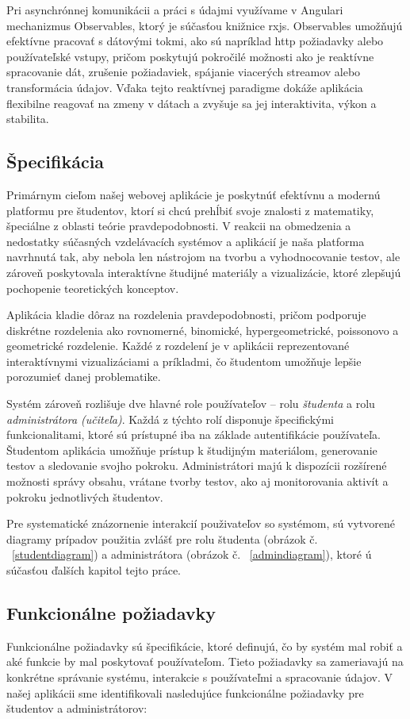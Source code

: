  Pri asynchrónnej komunikácii a práci s údajmi využívame v Angulari mechanizmus Observables, ktorý je súčasťou knižnice \acrshort{rxjs}. 
 Observables umožňujú efektívne pracovať s dátovými tokmi, ako sú napríklad \acrshort{http} požiadavky alebo používateľské vstupy, pričom poskytujú pokročilé možnosti ako je reaktívne spracovanie dát, zrušenie požiadaviek, spájanie viacerých streamov alebo transformácia údajov. 
 Vďaka tejto reaktívnej paradigme dokáže aplikácia flexibilne reagovať na zmeny v dátach a zvyšuje sa jej interaktivita, výkon a stabilita.


\subsection{Špecifikácia}
Primárnym cieľom našej webovej aplikácie je poskytnúť efektívnu a modernú platformu pre študentov, ktorí si chcú prehĺbiť svoje znalosti z matematiky, špeciálne z oblasti teórie pravdepodobnosti.
 V reakcii na obmedzenia a nedostatky súčasných vzdelávacích systémov a aplikácií je naša platforma navrhnutá tak, aby nebola len nástrojom na tvorbu a vyhodnocovanie testov, ale zároveň poskytovala interaktívne študijné materiály a vizualizácie, ktoré zlepšujú pochopenie teoretických konceptov.

Aplikácia kladie dôraz na rozdelenia pravdepodobnosti, pričom podporuje diskrétne rozdelenia ako rovnomerné, binomické, hypergeometrické, poissonovo a geometrické rozdelenie.
 Každé z rozdelení je v aplikácii reprezentované interaktívnymi vizualizáciami a príkladmi, čo študentom umožňuje lepšie porozumieť danej problematike.

Systém zároveň rozlišuje dve hlavné role používateľov – rolu \textit{študenta} a rolu \textit{administrátora (učiteľa)}. Každá z týchto rolí disponuje špecifickými funkcionalitami, ktoré sú prístupné iba na základe autentifikácie používateľa.
 Študentom aplikácia umožňuje prístup k študijným materiálom, generovanie testov a sledovanie svojho pokroku.
  Administrátori majú k dispozícii rozšírené možnosti správy obsahu, vrátane tvorby testov, ako aj monitorovania aktivít a pokroku jednotlivých študentov.

  Pre systematické znázornenie interakcií použivateľov so systémom, sú vytvorené diagramy prípadov použitia zvlášť pre rolu študenta (obrázok č. ~\ref{studentdiagram}) a administrátora (obrázok č. ~\ref{admindiagram}), ktoré ú súčasťou ďalších kapitol tejto práce.

\subsection{Funkcionálne požiadavky}
Funkcionálne požiadavky sú špecifikácie, ktoré definujú, čo by systém mal robiť a aké funkcie by mal poskytovať používateľom.
 Tieto požiadavky sa zameriavajú na konkrétne správanie systému, interakcie s používateľmi a spracovanie údajov. 
 V našej aplikácii sme identifikovali nasledujúce funkcionálne požiadavky pre študentov a administrátorov:
